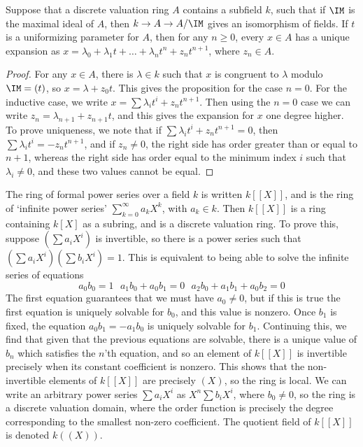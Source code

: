 \begin{prop}
    Suppose that a discrete valuation ring $A$ contains a subfield $k$, such that if $\IM$ is the maximal ideal of $A$, then $k \to A \to A/\IM$ gives an isomorphism of fields. If $t$ is a uniformizing parameter for $A$, then for any $n \geq 0$, every $x \in A$ has a unique expansion as $x = \lambda_0 + \lambda_1 t + \dots + \lambda_n t^n + z_nt^{n+1}$, where $z_n \in A$.
\end{prop}
\begin{proof}
    For any $x \in A$, there is $\lambda \in k$ such that $x$ is congruent to $\lambda$ modulo $\IM = (t)$, so $x = \lambda + z_0t$. This gives the proposition for the case $n = 0$. For the inductive case, we write $x = \sum \lambda_i t^i + z_n t^{n+1}$. Then using the $n = 0$ case we can write $z_n = \lambda_{n+1} + z_{n+1}t$, and this gives the expansion for $x$ one degree higher. To prove uniqueness, we note that if $\sum \lambda_i t^i + z_n t^{n+1} = 0$, then $\sum \lambda_i t^i = -z_n t^{n+1}$, and if $z_n \neq 0$, the right side has order greater than or equal to $n+1$, whereas the right side has order equal to the minimum index $i$ such that $\lambda_i \neq 0$, and these two values cannot be equal.
\end{proof}

The ring of formal power series over a field $k$ is written $k[[X]]$, and is the ring of `infinite power series' $\sum_{k = 0}^\infty a_k X^k$, with $a_k \in k$. Then $k[[X]]$ is a ring containing $k[X]$ as a subring, and is a discrete valuation ring. To prove this, suppose $\left( \sum a_i X^i \right)$ is invertible, so there is a power series such that $\left( \sum a_i X^i \right) \left( \sum b_i X^i \right) = 1$. This is equivalent to being able to solve the infinite series of equations
%
\[ a_0b_0 = 1\ \ \ a_1b_0 + a_0b_1 = 0\ \ \ a_2b_0 + a_1b_1 + a_0b_2 = 0 \]
%
The first equation guarantees that we must have $a_0 \neq 0$, but if this is true the first equation is uniquely solvable for $b_0$, and this value is nonzero. Once $b_1$ is fixed, the equation $a_0b_1 = -a_1b_0$ is uniquely solvable for $b_1$. Continuing this, we find that given that the previous equations are solvable, there is a unique value of $b_n$ which satisfies the $n$'th equation, and so an element of $k[[X]]$ is invertible precisely when its constant coefficient is nonzero. This shows that the non-invertible elements of $k[[X]]$ are precisely $(X)$, so the ring is local. We can write an arbitrary power series $\sum a_i X^i$ as $X^n \sum b_i X^i$, where $b_0 \neq 0$, so the ring is a discrete valuation domain, where the order function is precisely the degree corresponding to the smallest non-zero coefficient. The quotient field of $k[[X]]$ is denoted $k((X))$.

